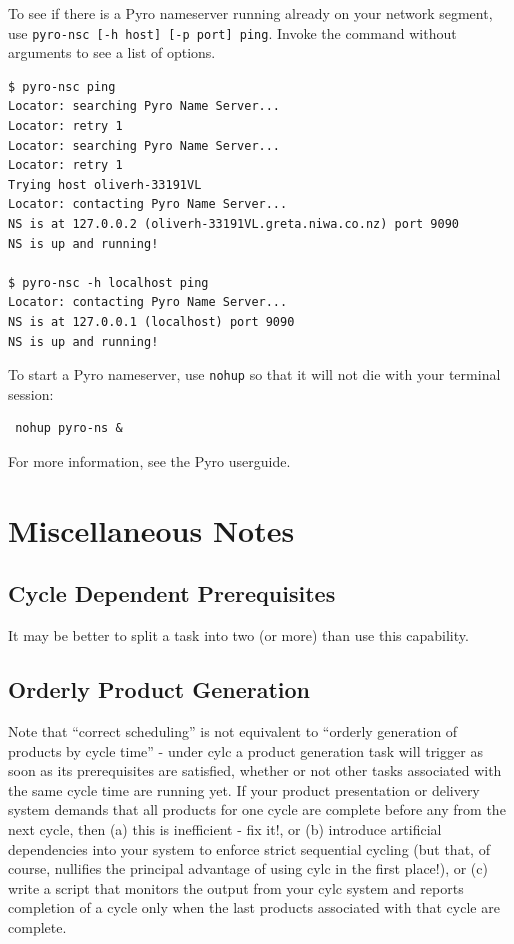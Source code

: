 \documentclass[11pt,a4paper]{article}
\begin{document}
To see if there is a Pyro nameserver running already on your network
segment, use \lstinline=pyro-nsc [-h host] [-p port] ping=. Invoke the
command without arguments to see a list of options.

\lstset{language=bash}

\begin{lstlisting}
$ pyro-nsc ping
Locator: searching Pyro Name Server...
Locator: retry 1
Locator: searching Pyro Name Server...
Locator: retry 1
Trying host oliverh-33191VL
Locator: contacting Pyro Name Server...
NS is at 127.0.0.2 (oliverh-33191VL.greta.niwa.co.nz) port 9090
NS is up and running!

$ pyro-nsc -h localhost ping
Locator: contacting Pyro Name Server...
NS is at 127.0.0.1 (localhost) port 9090
NS is up and running!
\end{lstlisting}

To start a Pyro nameserver, use \lstinline{nohup} so that it
will not die with your terminal session: 

\begin{lstlisting}
 nohup pyro-ns &
\end{lstlisting}

For more information, see the Pyro userguide.

\pagebreak
\section{Miscellaneous Notes}
\label{MiscellaneousNotes}

\subsection{Cycle Dependent Prerequisites}

It may be better to split a task into two (or more) than use this 
capability.

\subsection{Orderly Product Generation}
\label{OrderlyProductGeneration}

Note that ``correct scheduling'' is not equivalent to ``orderly
generation of products by cycle time'' - under cylc a product
generation task will trigger as soon as its prerequisites are satisfied,
whether or not other tasks associated with the same cycle time are
running yet. If your product presentation or delivery system demands
that all products for one cycle are complete before any from the next
cycle, then (a) this is inefficient - fix it!, or (b) introduce artificial
dependencies into your system to enforce strict sequential cycling (but
that, of course, nullifies the principal advantage of using cylc in the
first place!), or (c) write a script that monitors the output from 
your cylc system and reports completion of a cycle only when the last
products associated with that cycle are complete. 
\end{document}
